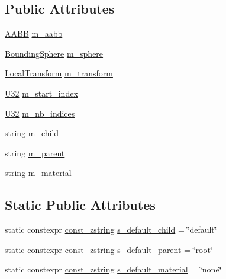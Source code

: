 \subsection*{Public Attributes}
\begin{DoxyCompactItemize}
\item 
\hyperlink{classmage_1_1_a_a_b_b}{A\+A\+BB} \hyperlink{structmage_1_1rendering_1_1_model_part_a69f7f90a31e48a286fecebc9e680b5ef}{m\+\_\+aabb}
\item 
\hyperlink{classmage_1_1_bounding_sphere}{Bounding\+Sphere} \hyperlink{structmage_1_1rendering_1_1_model_part_aa2204e02fe90f993990cdda677bff6e7}{m\+\_\+sphere}
\item 
\hyperlink{classmage_1_1_local_transform}{Local\+Transform} \hyperlink{structmage_1_1rendering_1_1_model_part_af34853cb09b179bd8ffb0da151914066}{m\+\_\+transform}
\item 
\hyperlink{namespacemage_a41c104c036fba3756a74e19f793eeaa1}{U32} \hyperlink{structmage_1_1rendering_1_1_model_part_a251d19417a0b4abe98faeae767b9fef4}{m\+\_\+start\+\_\+index}
\item 
\hyperlink{namespacemage_a41c104c036fba3756a74e19f793eeaa1}{U32} \hyperlink{structmage_1_1rendering_1_1_model_part_a6e622f4bcb1ada388c3ee489c22e4547}{m\+\_\+nb\+\_\+indices}
\item 
string \hyperlink{structmage_1_1rendering_1_1_model_part_ad2eb9ff5aaeecf676b54a1e2d7231ee8}{m\+\_\+child}
\item 
string \hyperlink{structmage_1_1rendering_1_1_model_part_a906ce278d6911d1163c8ce3a521c6598}{m\+\_\+parent}
\item 
string \hyperlink{structmage_1_1rendering_1_1_model_part_a1b2b0bf7c9acc87fc1673aac67a1849b}{m\+\_\+material}
\end{DoxyCompactItemize}
\subsection*{Static Public Attributes}
\begin{DoxyCompactItemize}
\item 
static constexpr \hyperlink{namespacemage_abfd9206dc607ceb5d13ec68bf075a5c0}{const\+\_\+zstring} \hyperlink{structmage_1_1rendering_1_1_model_part_a3571b142c7948d7ab5af699799c69b42}{s\+\_\+default\+\_\+child} = \char`\"{}default\char`\"{}
\item 
static constexpr \hyperlink{namespacemage_abfd9206dc607ceb5d13ec68bf075a5c0}{const\+\_\+zstring} \hyperlink{structmage_1_1rendering_1_1_model_part_ab6747ba3fd20c9f55f1d9bb7a64033e5}{s\+\_\+default\+\_\+parent} = \char`\"{}root\char`\"{}
\item 
static constexpr \hyperlink{namespacemage_abfd9206dc607ceb5d13ec68bf075a5c0}{const\+\_\+zstring} \hyperlink{structmage_1_1rendering_1_1_model_part_a833762db3fb81dd2086e9b89da158b12}{s\+\_\+default\+\_\+material} = \char`\"{}none\char`\"{}
\end{DoxyCompactItemize}


